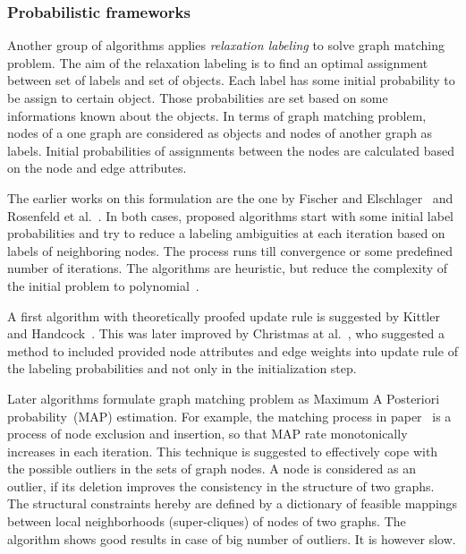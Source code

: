 \subsubsection{Probabilistic frameworks}
Another group of algorithms applies \emph{relaxation labeling} to solve graph matching problem. The aim of the relaxation labeling is to find an optimal assignment between set of labels and set of objects. Each label has some initial probability to be assign to certain object. Those probabilities are set based on some informations known about the objects. In terms of graph matching problem, nodes of a one graph are considered as objects and nodes of another graph as labels. Initial probabilities of assignments between the nodes are calculated  based on the node and edge attributes. 

The earlier works on this formulation are the one by Fischer and Elschlager~\cite{Fischler1973} and Rosenfeld et al.~\cite{Rosenfeld1976}. In both cases, proposed algorithms start with some initial label probabilities and try to reduce a labeling ambiguities at each iteration based on labels of neighboring nodes. The process runs till convergence or some predefined number of iterations. The algorithms are heuristic, but reduce the complexity of the initial problem to polynomial~\cite{Christmas1995}.

A first algorithm with theoretically proofed update rule is suggested by Kittler and Handcock~\cite{Hancock_Kittler}. This was later improved by Christmas at al.~\cite{Christmas1995}, who suggested a method to included provided node attributes and edge weights into update rule of the labeling probabilities and not only in the initialization step.

Later algorithms formulate graph matching problem as Maximum A Posteriori probability~(MAP) estimation. For example, the matching process in paper~\cite{Hancock_StrucMatch} is a process of node exclusion and insertion, so that MAP rate monotonically increases in each iteration. This technique is suggested to effectively cope with the possible outliers in the sets of graph nodes. A node is considered as an outlier, if its deletion improves the consistency in the structure of two graphs. The structural constraints hereby are defined by a dictionary of feasible mappings between local neighborhoods (super-cliques) of nodes of two graphs. The algorithm shows good results in case of big number of outliers. It is however slow.

